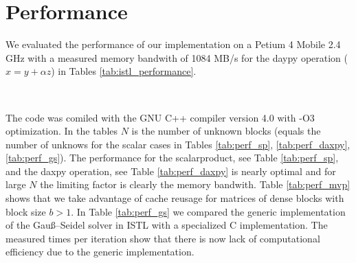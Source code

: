 \documentclass[11pt]{article}
\begin{document}
{\section{Performance}
We evaluated the performance of our implementation on a Petium 4 Mobile
2.4 GHz with a measured memory bandwith of 1084 MB/s for the daypy
operation ($x = y + \alpha z$) in Tables
\ref{tab:istl_performance}. 
\begin{table}[htb]
  \centering
  \caption{Performance Tests}
  \label{tab:istl_performance}
  \mbox{\small
    }
  \mbox{\small
    }
\end{table}
The code was comiled with the GNU C++ 
compiler version 4.0 with -O3 optimization. In the tables $N$ is the
number of 
unknown blocks (equals the number of unknows for the scalar cases in
Tables \ref{tab:perf_sp}, \ref{tab:perf_daxpy}, \ref{tab:perf_gs}).
The performance for the scalarproduct,
see Table \ref{tab:perf_sp},
and the daxpy operation, see Table \ref{tab:perf_daxpy}  is nearly
optimal and for large $N$ the limiting factor is clearly the memory
bandwith. Table \ref{tab:perf_mvp} shows that we take advantage of
cache reusage for matrices of dense blocks with block size $b>1$.
In Table
\ref{tab:perf_gs} we compared the generic implementation of
the Gau\ss{}--Seidel solver in ISTL with a specialized C
implementation. The measured times per iteration show that there is
now lack of computational efficiency due to the generic implementation. 

}
\end{document}

